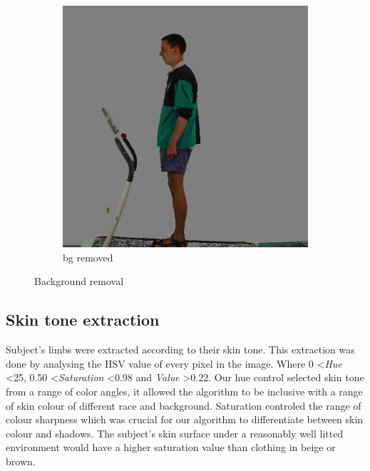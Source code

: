 \documentclass[10pt,journal,compsoc]{IEEEtran}
\begin{document}
\begin{figure}[!htb]
\begin{subfigure}[h]{0.3\linewidth}
\includegraphics[width=\linewidth]{noGreen}
    \caption{bg removed}
\end{subfigure}%
\caption{Background removal}
\end{figure}


\subsection{Skin tone extraction}
Subject's limbs were extracted according to their skin tone. This extraction was done by analysing the HSV value of every pixel in the image. Where 0 \textless\textit{Hue} \textless25, 0.50 \textless\textit{Saturation} \textless0.98 and \textit{Value} \textgreater0.22. Our hue control selected skin tone from a range of color angles, it allowed the algorithm to be inclusive with a range of skin colour of different race and background\cite{Kolkur2017}. Saturation controled the range of colour sharpness which was crucial for our algorithm to differentiate between skin colour and shadows. The subject's skin surface under a reasonably well litted environment would have a higher saturation value than clothing in beige or brown.
\end{document}
